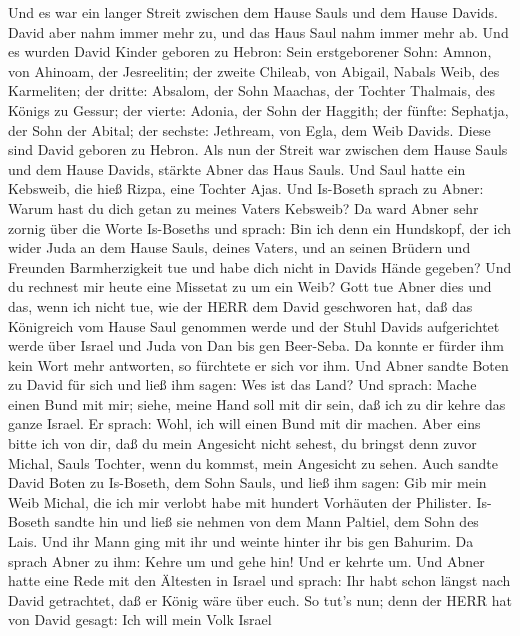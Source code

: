  Und es war ein langer Streit zwischen dem Hause Sauls und
dem Hause Davids. David aber nahm immer mehr zu, und das Haus Saul nahm
immer mehr ab.  Und es wurden David Kinder geboren zu
Hebron: Sein erstgeborener Sohn: Amnon, von Ahinoam, der Jesreelitin;
 der zweite Chileab, von Abigail, Nabals Weib, des
Karmeliten; der dritte: Absalom, der Sohn Maachas, der Tochter Thalmais,
des Königs zu Gessur;  der vierte: Adonia, der Sohn der
Haggith; der fünfte: Sephatja, der Sohn der Abital;  der
sechste: Jethream, von Egla, dem Weib Davids. Diese sind David geboren
zu Hebron.  Als nun der Streit war zwischen dem Hause Sauls
und dem Hause Davids, stärkte Abner das Haus Sauls.  Und
Saul hatte ein Kebsweib, die hieß Rizpa, eine Tochter Ajas. Und
Is-Boseth sprach zu Abner: Warum hast du dich getan zu meines Vaters
Kebsweib?  Da ward Abner sehr zornig über die Worte
Is-Boseths und sprach: Bin ich denn ein Hundskopf, der ich wider Juda an
dem Hause Sauls, deines Vaters, und an seinen Brüdern und Freunden
Barmherzigkeit tue und habe dich nicht in Davids Hände gegeben? Und du
rechnest mir heute eine Missetat zu um ein Weib?  Gott tue
Abner dies und das, wenn ich nicht tue, wie der HERR dem David
geschworen hat,  daß das Königreich vom Hause Saul genommen
werde und der Stuhl Davids aufgerichtet werde über Israel und Juda von
Dan bis gen Beer-Seba.  Da konnte er fürder ihm kein Wort
mehr antworten, so fürchtete er sich vor ihm.  Und Abner
sandte Boten zu David für sich und ließ ihm sagen: Wes ist das Land? Und
sprach: Mache einen Bund mit mir; siehe, meine Hand soll mit dir sein,
daß ich zu dir kehre das ganze Israel.  Er sprach: Wohl,
ich will einen Bund mit dir machen. Aber eins bitte ich von dir, daß du
mein Angesicht nicht sehest, du bringst denn zuvor Michal, Sauls
Tochter, wenn du kommst, mein Angesicht zu sehen.  Auch
sandte David Boten zu Is-Boseth, dem Sohn Sauls, und ließ ihm sagen: Gib
mir mein Weib Michal, die ich mir verlobt habe mit hundert Vorhäuten der
Philister.  Is-Boseth sandte hin und ließ sie nehmen von
dem Mann Paltiel, dem Sohn des Lais.  Und ihr Mann ging mit
ihr und weinte hinter ihr bis gen Bahurim. Da sprach Abner zu ihm: Kehre
um und gehe hin! Und er kehrte um.  Und Abner hatte eine
Rede mit den Ältesten in Israel und sprach: Ihr habt schon längst nach
David getrachtet, daß er König wäre über euch.  So tut's
nun; denn der HERR hat von David gesagt: Ich will mein Volk Israel
